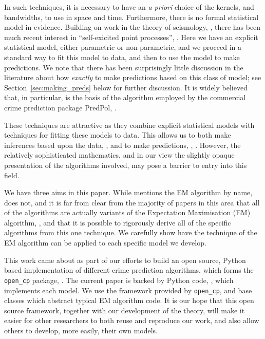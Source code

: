 \documentclass[twoside,a4paper]{article}
\theoremstyle{plain}
\theoremstyle{definition}
\begin{document}
In such techniques, it is necessary to have an \emph{a priori} choice of the kernels, and
bandwidths, to use in space and time.  Furthermore, there is no formal statistical model
in evidence.  Building on work in the theory of seismology, \cite{ml, vs, zovj}, there has
been much recent interest in ``self-exicited point processes'', \cite{mohler, sepp, sepp2, rc}.
Here we have an explicit statistical model, either parametric or non-parametric, and
we proceed in a standard way to fit this model to data, and then to use the model to make
predictions.  We note that there has been surprisingly little discussion in the literature
about how \emph{exactly} to make predictions based on this class of model; see
Section~\ref{sec:making_preds} below for further discussion.
It is widely believed that, in particular, \cite{sepp2} is the basis of the algorithm
employed by the commercial crime prediction package PredPol, \cite{predpol}.

These techniques are attractive as they combine explicit statistical models with techniques
for fitting these models to data.  This allows us to both make inferences based upon the
data, \cite[Section~4]{sepp}, and to make predictions, \cite[Section~5]{sepp}, \cite{sepp2, rc}.
However, the relatively sophisticated mathematics, and in our view the slightly
opaque presentation of the algorithms involved, may pose a barrier to entry into this field.

We have three aims in this paper.  While \cite{sepp2} mentions the EM algorithm by name,
\cite{sepp} does not, and it is far from clear from the majority of papers in this area
that all of the algorithms are actually variants of the Expectation Maximisation (EM)
algorithm, \cite{mk}, and that it is possible to rigorously derive all of the
specific algorithms from this one technique.  We carefully show have the technique of the
EM algorithm can be applied to each specific model we develop.

This work came about as part of our efforts to build an open source, Python based
implementation of different crime prediction algorithms, which forms the \texttt{open\_cp}
package, \cite{opencp}.
The current paper is backed by Python code, \cite{seppcode},
which implements each model.  We use the framework provided by \texttt{open\_cp}, and base
classes which abstract typical EM algorithm code.  It is our hope that this open source
framework, together with our development of the theory, will make it easier for other
researchers to both reuse and reproduce our work, and also allow others to develop, more
easily, their own models.
\end{document}

